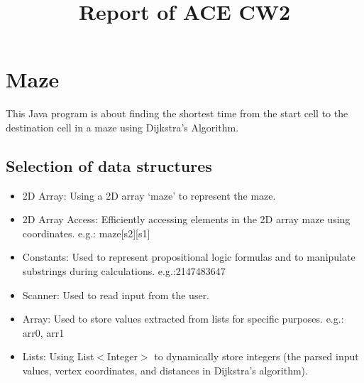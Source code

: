 \documentclass{article}
\title{Report of ACE CW2}
\date{}
\begin{document}
\maketitle
\RaggedRight
\section{Maze}
This Java program is about finding the shortest time from the start cell to the destination cell in a maze using Dijkstra's Algorithm.
\subsection{Selection of data structures}
\begin{itemize}
\item 2D Array: Using a 2D array `maze' to represent the maze.
\item 2D Array Access: Efficiently accessing elements in the 2D array maze using coordinates. e.g.: maze[s2][s1]
\item Constants: Used to represent propositional logic formulas and to manipulate substrings during calculations.  e.g.:2147483647
\item Scanner: Used to read input from the user.
\item Array: Used to store values extracted from lists for specific purposes. e.g.: arr0, arr1
\item Lists: Using List$<$Integer$>$ to dynamically store integers (the parsed input values, vertex coordinates, and distances in Dijkstra's algorithm).
\end{itemize}
\end{document}
